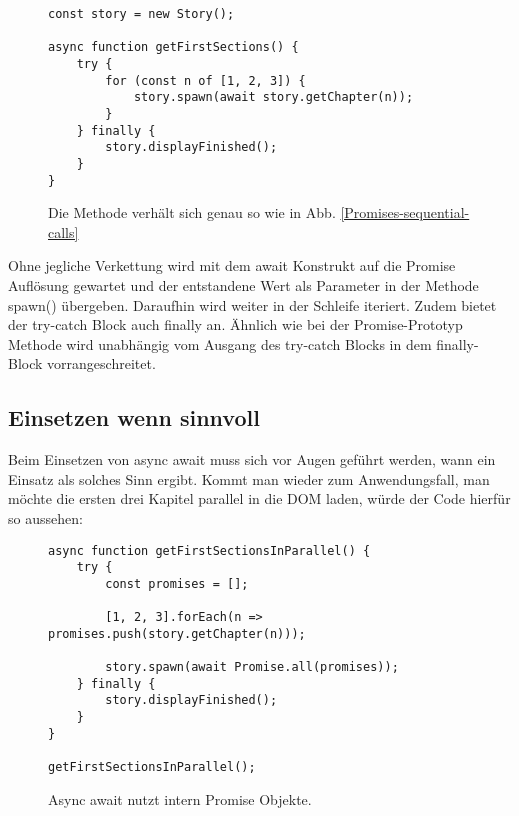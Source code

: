 \begin{figure}[H]
\begin{lstlisting}[basicstyle=\small]
const story = new Story();

async function getFirstSections() {
    try {
        for (const n of [1, 2, 3]) {
            story.spawn(await story.getChapter(n));
        }
    } finally {
        story.displayFinished();
    }
}
\end{lstlisting}
\caption{Die Methode verhält sich genau so wie in Abb. \ref{Promises-sequential-calls}}
\end{figure}

\noindent
Ohne jegliche Verkettung wird mit dem await Konstrukt auf die Promise Auflösung gewartet und der entstandene Wert als Parameter in der Methode spawn() übergeben. Daraufhin wird weiter in der Schleife iteriert. Zudem bietet der try-catch Block auch finally an. Ähnlich wie bei der Promise-Prototyp Methode wird unabhängig vom Ausgang des try-catch Blocks in dem finally-Block vorrangeschreitet.

\subsection{Einsetzen wenn sinnvoll}

Beim Einsetzen von async await muss sich vor Augen geführt werden, wann ein Einsatz als solches Sinn ergibt. Kommt man wieder zum Anwendungsfall, man möchte die ersten drei Kapitel parallel in die DOM laden, würde der Code hierfür so aussehen:

\begin{figure}[H]
\begin{lstlisting}[basicstyle=\small]
async function getFirstSectionsInParallel() {
    try {
        const promises = [];

        [1, 2, 3].forEach(n => promises.push(story.getChapter(n)));

        story.spawn(await Promise.all(promises));
    } finally {
        story.displayFinished();
    }
}

getFirstSectionsInParallel();
\end{lstlisting}
\caption{Async await nutzt intern Promise Objekte.}
\end{figure}

